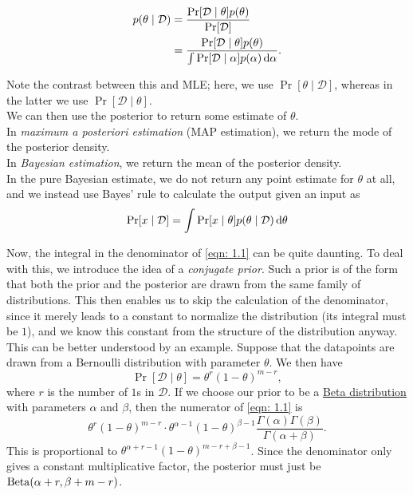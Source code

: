 \documentclass{article}
\begin{document}
			\begin{align}
				p(\theta\mid\mathcal{D}) &= \frac{\Pr[\mathcal{D}\mid\theta] p(\theta)}{\Pr[\mathcal{D}]} \nonumber \\
					&= \frac{\Pr[\mathcal{D}\mid\theta] p(\theta)}{\int \Pr[\mathcal{D}\mid\alpha] p(\alpha) \dif \alpha}. \label{eqn: 1.1}
			\end{align}

			Note the contrast between this and MLE; here, we use $\Pr[\theta\mid\mathcal{D}]$, whereas in the latter we use $\Pr[\mathcal{D}\mid\theta]$.\\
			We can then use the posterior to return some estimate of $\theta$.\\
			In \emph{maximum a posteriori estimation} (MAP estimation), we return the mode of the posterior density.\\
			In \emph{Bayesian estimation}, we return the mean of the posterior density.\\
			In the pure Bayesian estimate, we do not return any point estimate for $\theta$ at all, and we instead use Bayes' rule to calculate the output given an input as
			\[ \Pr[x \mid \mathcal{D}] = \int \Pr[x\mid\theta] p(\theta\mid\mathcal{D}) \dif \theta \]

			Now, the integral in the denominator of \eqref{eqn: 1.1} can be quite daunting. To deal with this, we introduce the idea of a \emph{conjugate prior}. Such a prior is of the form that both the prior and the posterior are drawn from the same family of distributions. This then enables us to skip the calculation of the denominator, since it merely leads to a constant to normalize the distribution (its integral must be $1$), and we know this constant from the structure of the distribution anyway. This can be better understood by an example. Suppose that the datapoints are drawn from a Bernoulli distribution with parameter $\theta$. We then have
			\[ \Pr[\mathcal{D} \mid \theta] = \theta^r (1-\theta)^{m-r}, \]
			where $r$ is the number of $1$s in $\mathcal{D}$. If we choose our prior to be a \href{https://en.wikipedia.org/wiki/Beta_distribution}{Beta distribution} with parameters $\alpha$ and $\beta$, then the numerator of \eqref{eqn: 1.1} is
			\[ \theta^r (1-\theta)^{m-r} \cdot \theta^{\alpha-1} (1-\theta)^{\beta-1} \frac{\Gamma(\alpha)\Gamma(\beta)}{\Gamma(\alpha+\beta)}. \]
			This is proportional to $\theta^{\alpha+r-1}(1-\theta)^{m-r+\beta-1}$. Since the denominator only gives a constant multiplicative factor, the posterior must just be $\operatorname{Beta}(\alpha+r,\beta+m-r)$.\\
\end{document}
